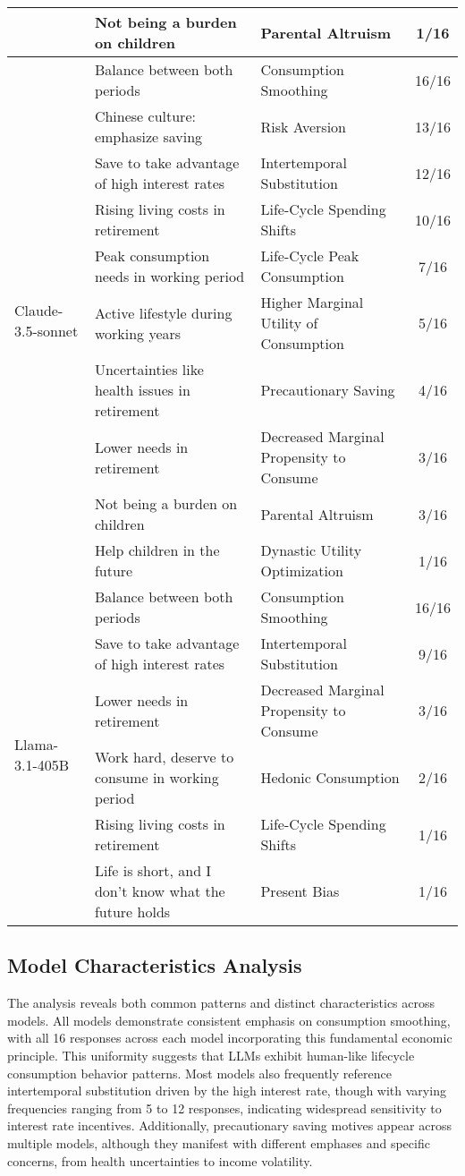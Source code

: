 \documentclass[12pt]{article}
\begin{document}
\begin{CJK*}{UTF8}{gbsn}
\begin{longtable}{p{2cm}p{6cm}p{4cm}c}
 & Not being a burden on children & Parental Altruism & 1/16 \\
\hline
\multirow{10}{=}{Claude-3.5-sonnet}
 & Balance between both periods & Consumption Smoothing & 16/16 \\
 & Chinese culture: emphasize saving & Risk Aversion & 13/16 \\
 & Save to take advantage of high interest rates & Intertemporal Substitution & 12/16 \\
 & Rising living costs in retirement & Life-Cycle Spending Shifts & 10/16 \\
 & Peak consumption needs in working period & Life-Cycle Peak Consumption & 7/16 \\
 & Active lifestyle during working years & Higher Marginal Utility of Consumption & 5/16 \\
 & Uncertainties like health issues in retirement & Precautionary Saving & 4/16 \\
 & Lower needs in retirement & Decreased Marginal Propensity to Consume & 3/16 \\
 & Not being a burden on children & Parental Altruism & 3/16 \\
 & Help children in the future & Dynastic Utility Optimization & 1/16 \\
\hline
\multirow{6}{=}{Llama-3.1-405B}
 & Balance between both periods & Consumption Smoothing & 16/16 \\
 & Save to take advantage of high interest rates & Intertemporal Substitution & 9/16 \\
 & Lower needs in retirement & Decreased Marginal Propensity to Consume & 3/16 \\
 & Work hard, deserve to consume in working period & Hedonic Consumption & 2/16 \\
 & Rising living costs in retirement & Life-Cycle Spending Shifts & 1/16 \\
 & Life is short, and I don't know what the future holds & Present Bias & 1/16 %
\label{tab:motives}
\end{longtable}



\subsection{Model Characteristics Analysis}

The analysis reveals both common patterns and distinct characteristics across models. All models demonstrate consistent emphasis on consumption smoothing, with all 16 responses across each model incorporating this fundamental economic principle. This uniformity suggests that LLMs exhibit human-like lifecycle consumption behavior patterns. Most models also frequently reference intertemporal substitution driven by the high interest rate, though with varying frequencies ranging from 5 to 12 responses, indicating widespread sensitivity to interest rate incentives. Additionally, precautionary saving motives appear across multiple models, although they manifest with different emphases and specific concerns, from health uncertainties to income volatility.


\end{CJK*}
\end{document}
